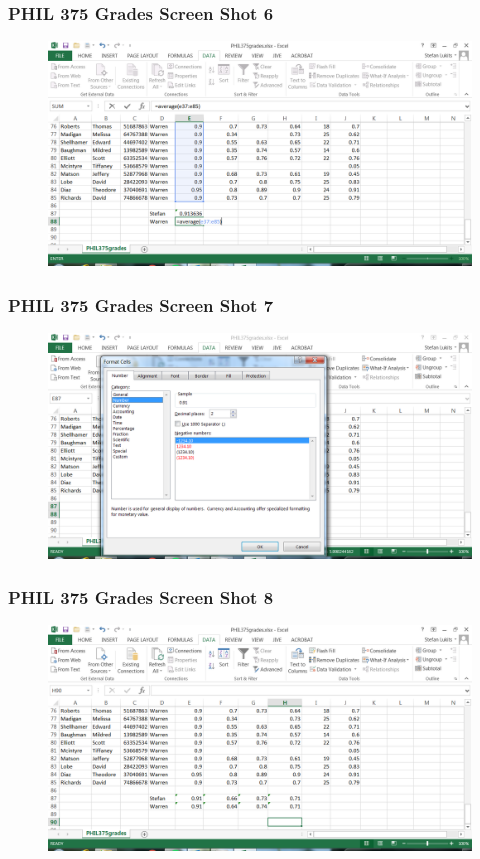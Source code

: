 \documentclass[xcolor=dvipsnames]{beamer}
\begin{document}
\begin{frame}
  \frametitle{PHIL 375 Grades Screen Shot 6}
  \begin{figure}[h]
    \includegraphics[scale=.42]{./e06.PNG}
  \end{figure}
\end{frame}

\begin{frame}
  \frametitle{PHIL 375 Grades Screen Shot 7}
  \begin{figure}[h]
    \includegraphics[scale=.42]{./e07.PNG}
  \end{figure}
\end{frame}

\begin{frame}
  \frametitle{PHIL 375 Grades Screen Shot 8}
  \begin{figure}[h]
    \includegraphics[scale=.42]{./e08.PNG}
  \end{figure}
\end{frame}
\end{document}
